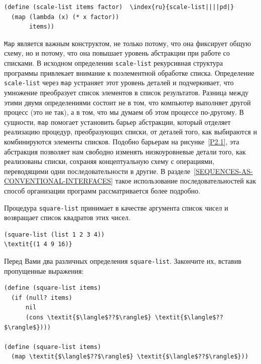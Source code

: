 \begin{Verbatim}[fontsize=\small]
(define (scale-list items factor)  \index{ru}{scale-list||||pd|}
  (map (lambda (x) (* x factor))
       items))
\end{Verbatim}

{\tt Map} является важным конструктом, не только
потому, что она фиксирует общую схему, но и потому, что она повышает
уровень абстракции при работе со списками.  В исходном определении
{\tt scale-list} рекурсивная структура программы привлекает
внимание к поэлементной обработке списка.  Определение
{\tt scale-list} через {\tt map} устраняет этот уровень
деталей и подчеркивает, что умножение преобразует список элементов в
список результатов.  Разница между этими двумя определениями состоит
не в том, что компьютер выполняет другой процесс (это не так), а в том,
что мы думаем об этом процессе по-другому.  В сущности,
{\tt map} помогает установить барьер абстракции, который
отделяет реализацию процедур, преобразующих списки, от
деталей того, как выбираются и комбинируются элементы списков.
Подобно барьерам на рисунке~\ref{P2.1}, эта абстракция
позволяет нам свободно изменять низкоуровневые детали того, как реализованы
списки, сохраняя концептуальную схему с операциями, переводящими одни 
последовательности в другие.  В разделе~\ref{SEQUENCES-AS-CONVENTIONAL-INTERFACES} 
такое использование последовательностей как способ организации
программ рассматривается более подробно.
\begin{exercise}{2.21}\label{EX2.21}%
Процедура {\tt square-list} принимает в качестве
аргумента список чисел и возвращает список квадратов этих чисел.

\begin{Verbatim}[fontsize=\small]
(square-list (list 1 2 3 4))
\textit{(1 4 9 16)}
\end{Verbatim}
Перед Вами два различных определения {\tt square-list}.
Закончите их, вставив пропущенные выражения:

\begin{Verbatim}[fontsize=\small]
(define (square-list items)
  (if (null? items)
      nil
      (cons \textit{$\langle$??$\rangle$} \textit{$\langle$??$\rangle$})))

(define (square-list items)
  (map \textit{$\langle$??$\rangle$} \textit{$\langle$??$\rangle$}))
\end{Verbatim}
\end{exercise}
